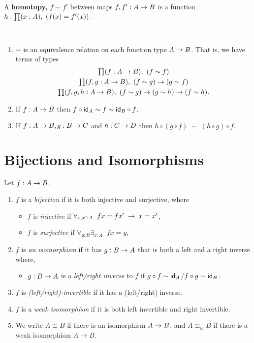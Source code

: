 \begin{defn}\label{defn:homotopy-between-functions}
  A \textbf{homotopy, $f\sim f'$} between maps $f,f':A\ra B$ is a function $h:\prd{x:A} (f(x)=f'(x))$.
\end{defn}

\begin{lem}\label{lem:homotopy-props}\ 
\begin{enumerate}
\item $\sim$ is an equivalence relation on each function type $A\ra B$.
  That is, we have terms of types
  \begin{gather*}
    \prd{f:A\to B} (f\sim f)\\
    \prd{f,g:A\to B} (f\sim g) \to (g\sim f)\\
    \prd{f,g,h:A\to B} (f\sim g) \to (g\sim h) \to (f\sim h).
  \end{gather*}
\item If $f:A\ra B$ then $f\circ \idfunc[A]\sim f\sim \idfunc[B]\circ f$.
\item If $f:A\ra B, g:B\ra C$ and $h:C\ra D$ then $h\circ (g\circ f)\;\sim\; (h\circ g)\circ f$.
\end{enumerate}
\end{lem}



\section{Bijections and Isomorphisms}

\begin{defn} \label{defn:isos}
Let $f:A\ra B$.
\begin{enumerate}
\item $f$ is a {\em bijection} if it is both injective and surjective, where
\begin{itemize}
\item $f$ is {\em injective} if $\forall_{x,x':A}\; \; fx=fx'\;\ra\; x=x'$,
\item $f$ is {\em surjective} if $\forall_{y:B}\exists_{x:A}\;\; fx=y$,
\end{itemize}
\item $f$ is {\em an isomorphism} if it has $g:B\ra A$ that is both a left and a right
inverse where,
\begin{itemize} \item $g:B\ra A$ is a {\em left/right inverse} to $f$ if 
$g\circ f\sim \idfunc[A]$/$f\circ g\sim \idfunc[B]$.
\end{itemize}
\item $f$ is {\em (left/right)-invertible} if it has a (left/right) inverse.
\item $f$ is a {\em weak isomorphism} if it is both left invertible and right invertible.
\item We write $A\cong B$ if there is an isomorphism $A\ra B$, and $A\cong_w B$ if there is a weak isomorphism $A\to B$.
\end{enumerate}
\end{defn}


